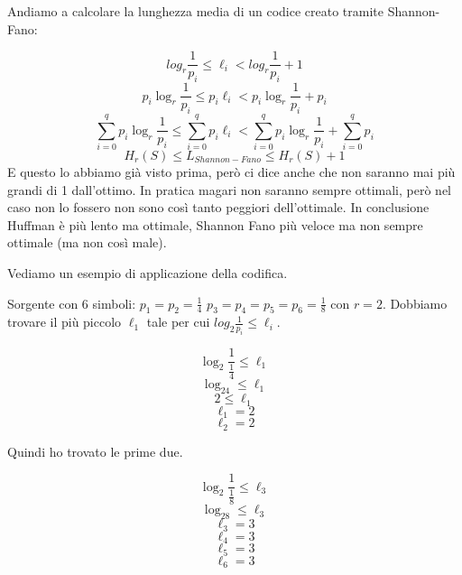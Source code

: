 Andiamo a calcolare la lunghezza media di un codice creato tramite Shannon-Fano:

\begin{equation*}
log_r\frac{1}{p_i} \leq \ell_i < log_r\frac{1}{p_i} + 1
\end{equation*}
\begin{equation*}
p_i\log_r\frac{1}{p_i} \leq p_i\ell_i < p_i\log_r\frac{1}{p_i} + p_i
\end{equation*}
\begin{equation*}
\sum_{i=0}^qp_i\log_r\frac{1}{p_i} \leq \sum_{i=0}^qp_i\ell_i < \sum_{i=0}^qp_i\log_r\frac{1}{p_i} + \sum_{i=0}^qp_i
\end{equation*}
\begin{equation*}
H_r(S) \leq L_{Shannon-Fano} \leq H_r(S) + 1
\end{equation*}
E questo lo abbiamo già visto prima, però ci dice anche che non saranno mai più grandi di 1 dall'ottimo.
In pratica magari non saranno sempre ottimali, però nel caso non lo fossero non sono così tanto peggiori dell'ottimale.
In conclusione Huffman è più lento ma ottimale, Shannon Fano più veloce ma non sempre ottimale (ma non così male).

Vediamo un esempio di applicazione della codifica.

Sorgente con 6 simboli: $p_1 = p_2 = \frac{1}{4}$ $p_3 = p_4 = p_5 = p_6 = \frac{1}{8}$ con $r=2$.
Dobbiamo trovare il più piccolo $\ell_1$ tale per cui $log_2\frac{1}{p_i} \leq \ell_i$.

\begin{equation*}
\log_2\frac{1}{\frac{1}{4}} \leq \ell_1
\end{equation*}
\begin{equation*}
\log_24 \leq \ell_1
\end{equation*}
\begin{equation*}
2 \leq \ell_1
\end{equation*}
\begin{equation*}
\ell_1 = 2
\end{equation*}
\begin{equation*}
\ell_2 = 2
\end{equation*}

Quindi ho trovato le prime due.

\begin{equation*}
\log_2\frac{1}{\frac{1}{8}} \leq \ell_3
\end{equation*}
\begin{equation*}
\log_28 \leq \ell_3
\end{equation*}
\begin{equation*}
\ell_3 = 3
\end{equation*}
\begin{equation*}
\ell_4 = 3
\end{equation*}
\begin{equation*}
\ell_5 = 3
\end{equation*}
\begin{equation*}
\ell_6 = 3
\end{equation*}

